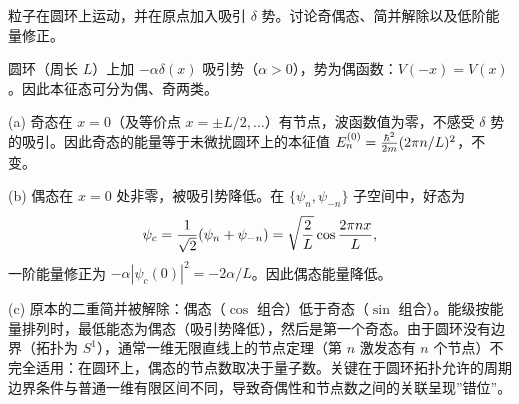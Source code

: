 \begin{question}
粒子在圆环上运动，并在原点加入吸引 $\delta$ 势。讨论奇偶态、简并解除以及低阶能量修正。
\end{question}
\begin{solution}
圆环（周长 $L$）上加 $-\alpha\delta(x)$ 吸引势（$\alpha>0$），势为偶函数：$V(-x)=V(x)$。因此本征态可分为偶、奇两类。

(a) 奇态在 $x=0$（及等价点 $x=\pm L/2,\dots$）有节点，波函数值为零，不感受 $\delta$ 势的吸引。因此奇态的能量等于未微扰圆环上的本征值 $E_n^{(0)} = {\hbar^2\over2m}(2\pi n/L)^2$，不变。

(b) 偶态在 $x=0$ 处非零，被吸引势降低。在 $\{\psi_n,\psi_{-n}\}$ 子空间中，好态为
\[
\psi_c = {1\over\sqrt2}(\psi_n+\psi_{-n}) = \sqrt{2\over L}\cos{2\pi nx\over L},
\]
一阶能量修正为 $-\alpha|\psi_c(0)|^2 = -2\alpha/L$。因此偶态能量降低。

(c) 原本的二重简并被解除：偶态（$\cos$ 组合）低于奇态（$\sin$ 组合）。能级按能量排列时，最低能态为偶态（吸引势降低），然后是第一个奇态。由于圆环没有边界（拓扑为 $S^1$），通常一维无限直线上的节点定理（第 $n$ 激发态有 $n$ 个节点）不完全适用：在圆环上，偶态的节点数取决于量子数。关键在于圆环拓扑允许的周期边界条件与普通一维有限区间不同，导致奇偶性和节点数之间的关联呈现”错位”。
\end{solution}


